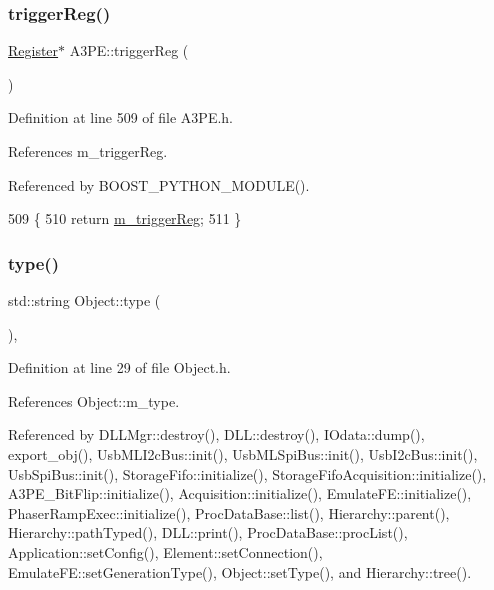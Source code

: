 \subsubsection{\texorpdfstring{trigger\+Reg()}{triggerReg()}}
{\footnotesize\ttfamily \hyperlink{classRegister}{Register}$\ast$ A3\+P\+E\+::trigger\+Reg (\begin{DoxyParamCaption}{ }\end{DoxyParamCaption})\hspace{0.3cm}{\ttfamily [inline]}}



Definition at line 509 of file A3\+P\+E.\+h.



References m\+\_\+trigger\+Reg.



Referenced by B\+O\+O\+S\+T\+\_\+\+P\+Y\+T\+H\+O\+N\+\_\+\+M\+O\+D\+U\+L\+E().


\begin{DoxyCode}
509                         \{
510     \textcolor{keywordflow}{return} \hyperlink{classA3PE_a750158ae488121ab7969452f061e678c}{m\_triggerReg};
511   \}
\end{DoxyCode}
\mbox{\label{classObject_a84f99f70f144a83e1582d1d0f84e4e62}} 
\subsubsection{\texorpdfstring{type()}{type()}}
{\footnotesize\ttfamily std\+::string Object\+::type (\begin{DoxyParamCaption}{ }\end{DoxyParamCaption})\hspace{0.3cm}{\ttfamily [inline]}, {\ttfamily [inherited]}}



Definition at line 29 of file Object.\+h.



References Object\+::m\+\_\+type.



Referenced by D\+L\+L\+Mgr\+::destroy(), D\+L\+L\+::destroy(), I\+Odata\+::dump(), export\+\_\+obj(), Usb\+M\+L\+I2c\+Bus\+::init(), Usb\+M\+L\+Spi\+Bus\+::init(), Usb\+I2c\+Bus\+::init(), Usb\+Spi\+Bus\+::init(), Storage\+Fifo\+::initialize(), Storage\+Fifo\+Acquisition\+::initialize(), A3\+P\+E\+\_\+\+Bit\+Flip\+::initialize(), Acquisition\+::initialize(), Emulate\+F\+E\+::initialize(), Phaser\+Ramp\+Exec\+::initialize(), Proc\+Data\+Base\+::list(), Hierarchy\+::parent(), Hierarchy\+::path\+Typed(), D\+L\+L\+::print(), Proc\+Data\+Base\+::proc\+List(), Application\+::set\+Config(), Element\+::set\+Connection(), Emulate\+F\+E\+::set\+Generation\+Type(), Object\+::set\+Type(), and Hierarchy\+::tree().


